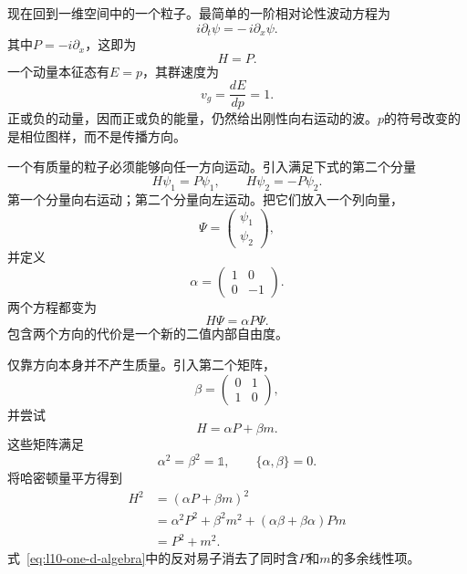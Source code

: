 现在回到一维空间中的一个粒子。最简单的一阶相对论性波动方程为
\begin{equation}
i\partial_t\psi=-\,i\partial_x\psi.
\label{eq:l10-right-mover}
\end{equation}
其中\(P=-i\partial_x\)，这即为
\begin{equation}
H=P.
\end{equation}
一个动量本征态有\(E=p\)，其群速度为
\begin{equation}
v_g=\frac{dE}{dp}=1.
\end{equation}
正或负的动量，因而正或负的能量，仍然给出刚性向右运动的波。\(p\)的符号改变的是相位图样，而不是传播方向。

一个有质量的粒子必须能够向任一方向运动。引入满足下式的第二个分量
\begin{equation}
H\psi_1=P\psi_1,
\qquad
H\psi_2=-P\psi_2.
\label{eq:l10-two-directions}
\end{equation}
第一个分量向右运动；第二个分量向左运动。把它们放入一个列向量，
\begin{equation}
\Psi=
\begin{pmatrix}
\psi_1\\
\psi_2
\end{pmatrix},
\end{equation}
并定义
\begin{equation}
\alpha=
\begin{pmatrix}
1&0\\
0&-1
\end{pmatrix}.
\end{equation}
两个方程都变为
\begin{equation}
H\Psi=\alpha P\Psi.
\label{eq:l10-massless-one-d}
\end{equation}
包含两个方向的代价是一个新的二值内部自由度。

仅靠方向本身并不产生质量。引入第二个矩阵，
\begin{equation}
\beta=
\begin{pmatrix}
0&1\\
1&0
\end{pmatrix},
\end{equation}
并尝试
\begin{equation}
H=\alpha P+\beta m.
\label{eq:l10-massive-one-d}
\end{equation}
这些矩阵满足
\begin{equation}
\alpha^2=\beta^2=\mathbb{1},
\qquad
\{\alpha,\beta\}=0.
\label{eq:l10-one-d-algebra}
\end{equation}
将哈密顿量平方得到
\begin{align}
H^2
&=(\alpha P+\beta m)^2\\
&=\alpha^2P^2+\beta^2m^2
  +(\alpha\beta+\beta\alpha)Pm\\
&=P^2+m^2.
\label{eq:l10-one-d-dispersion}
\end{align}
式~\eqref{eq:l10-one-d-algebra}中的反对易子消去了同时含\(P\)和\(m\)的多余线性项。

